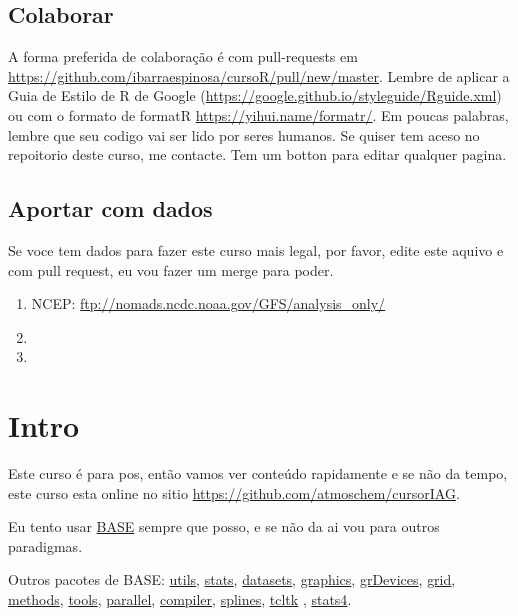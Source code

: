 \documentclass[]{book}
\theoremstyle{definition}
\theoremstyle{definition}
\theoremstyle{definition}
\theoremstyle{remark}
\begin{document}
\section{Colaborar}\label{colaborar}

A forma preferida de colaboração é com pull-requests em
\url{https://github.com/ibarraespinosa/cursoR/pull/new/master}. Lembre
de aplicar a Guia de Estilo de R de Google
(\url{https://google.github.io/styleguide/Rguide.xml}) ou com o formato
de formatR \url{https://yihui.name/formatr/}. Em poucas palabras, lembre
que seu codigo vai ser lido por seres humanos. Se quiser tem aceso no
repoitorio deste curso, me contacte. Tem um botton para editar qualquer
pagina.

\section{Aportar com dados}\label{aportar-com-dados}

Se voce tem dados para fazer este curso mais legal, por favor, edite
este aquivo e com pull request, eu vou fazer um merge para poder.

\begin{enumerate}
\def\labelenumi{\arabic{enumi}.}
\item
  NCEP: \url{ftp://nomads.ncdc.noaa.gov/GFS/analysis_only/}
\item
\item
\end{enumerate}

\chapter{Intro}\label{intro}

Este curso é para pos, então vamos ver conteúdo rapidamente e se não da
tempo, este curso esta online no sitio
\url{https://github.com/atmoschem/cursorIAG}.

Eu tento usar
\href{http://stat.ethz.ch/R-manual/R-devel/library/base/html/00Index.html}{BASE}
sempre que posso, e se não da ai vou para outros paradigmas.

Outros pacotes de BASE:
\href{http://stat.ethz.ch/R-manual/R-devel/library/utils/html/00Index.html}{utils},
\href{http://stat.ethz.ch/R-manual/R-devel/library/stats/html/00Index.html}{stats},
\href{http://stat.ethz.ch/R-manual/R-devel/library/datasets/html/00Index.html}{datasets},
\href{http://stat.ethz.ch/R-manual/R-devel/library/graphics/html/00Index.html}{graphics},
\href{https://stat.ethz.ch/R-manual/R-devel/library/grDevices/html/00Index.html}{grDevices},
\href{https://stat.ethz.ch/R-manual/R-devel/library/grid/html/00Index.html}{grid},
\href{https://stat.ethz.ch/R-manual/R-devel/library/methods/html/00Index.html}{methods},
\href{https://stat.ethz.ch/R-manual/R-devel/library/tools/html/00Index.html}{tools},
\href{https://stat.ethz.ch/R-manual/R-devel/library/parallel/html/00Index.html}{parallel},
\href{https://stat.ethz.ch/R-manual/R-devel/library/compiler/html/00Index.html}{compiler},
\href{https://stat.ethz.ch/R-manual/R-devel/library/splines/html/00Index.html}{splines},
\href{https://stat.ethz.ch/R-manual/R-devel/library/tcltk/html/00Index.html}{tcltk}
,
\href{https://stat.ethz.ch/R-manual/R-devel/library/stats4/html/00Index.html}{stats4}.
\end{document}
